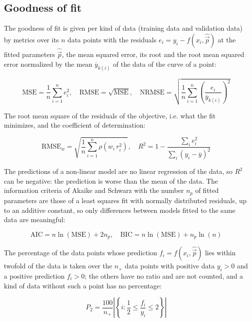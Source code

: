 \subsection{Goodness of fit}

The goodness of fit is given per kind of data (training data and validation data) by metrics over its $n$ data points with the residuals $e_i = y_i - f(x_i, \hat{\vec{p}})$ at the fitted parameters $\hat{\vec{p}}$, the mean squared error, its root and the root mean squared error normalized by the mean $\overline{y}_{k(i)}$ of the data of the curve of a point:

\begin{equation}
\mathrm{MSE} = \frac{1}{n} \sum_{i=1}^{n} e_i^2, \quad \mathrm{RMSE} = \sqrt{\mathrm{MSE}}, \quad \mathrm{NRMSE} = \sqrt{\frac{1}{n} \sum_{i=1}^{n} \left(\frac{e_i}{\overline{y}_{k(i)}}\right)^2}
\end{equation}

The root mean square of the residuals of the objective, i.e. what the fit minimizes, and the coefficient of determination:

\begin{equation}
\mathrm{RMSE}_w = \sqrt{\frac{1}{n} \sum_{i=1}^{n} \rho\left(w_i\, r_i^2\right)}, \quad R^2 = 1 - \frac{\sum_{i} e_i^2}{\sum_{i} \left(y_i - \overline{y}\right)^2}
\end{equation}

The predictions of a non-linear model are no linear regression of the data, so $R^2$ can be negative: the prediction is worse than the mean of the data. The information criteria of Akaike \cite{Akaike1974} and Schwarz \cite{Schwarz1978} with the number $n_p$ of fitted parameters are those of a least squares fit with normally distributed residuals, up to an additive constant, so only differences between models fitted to the same data are meaningful:

\begin{equation}
\mathrm{AIC} = n \ln(\mathrm{MSE}) + 2 n_p, \quad \mathrm{BIC} = n \ln(\mathrm{MSE}) + n_p \ln(n)
\end{equation}

The percentage of the data points whose prediction $f_i = f(x_i, \hat{\vec{p}})$ lies within twofold of the data is taken over the $n_+$ data points with positive data $y_i > 0$ and a positive prediction $f_i > 0$; the others have no ratio and are not counted, and a kind of data without such a point has no percentage:

\begin{equation}
P_2 = \frac{100}{n_+} \left|\left\{ i : \frac{1}{2} \le \frac{f_i}{y_i} \le 2 \right\}\right|
\end{equation}

